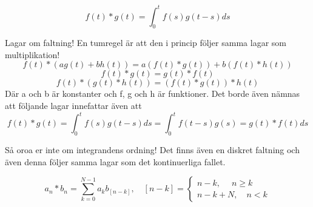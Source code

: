 \documentclass{article}
\begin{document}
$$ f(t) * g(t) = \int_{0}^t  f(s) g(t-s) ds $$

Lagar om faltning! En tumregel är att den i princip följer samma lagar som multiplikation!
$$f(t) * (a g(t) + b h(t) ) = a(f(t) * g(t)) + b(f(t) * h(t))$$ %
$$f(t) * g(t) = g(t) * f(t) $$ %
$$f(t) * (g(t) * h(t)) = (f(t) * g(t)) * h(t) $$ %
Där a och b är konstanter och f, g och h är funktioner. Det borde även nämnas att följande lagar innefattar även att
$$ f(t) * g(t) = \int_{0}^t  f(s) g(t-s) ds = \int_{0}^t  f(t-s) g(s) = g(t) * f(t) ds $$

Så oroa er inte om integrandens ordning! Det finns även en diskret faltning och även denna följer samma lagar som det kontinuerliga fallet.

$$a_n * b_n = \sum_{k=0}^{N-1} a_k b_{[n-k]}, \quad [n-k] = 
\begin{cases}
n-k, \quad  \; n \geq k \\
n-k+N, \quad  n < k
\end{cases}
$$

\end{document}
